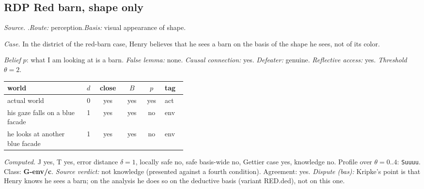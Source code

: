\subsection*{RDP \enspace Red barn, shape only}
\noindent\textit{Source.} \citet{Kripke2011}.\quad \textit{Route:} perception.\quad \textit{Basis:} visual appearance of shape.\par
\noindent\textit{Case.} In the district of the red-barn case, Henry believes that he sees a barn on the basis of the shape he sees, not of its color.\par
\noindent\textit{Belief} $p$: what I am looking at is a barn.
 \textit{False lemma:} none. \textit{Causal connection:} yes. \textit{Defeater:} genuine. \textit{Reflective access:} yes. \textit{Threshold} $\theta = 2$.\par
\begin{center}\begin{tabular}{@{}p{0.43\linewidth}rcccl@{}}
world & $d$ & close & $B$ & $p$ & tag \\ \midrule
actual world & 0 & yes & yes & yes & act \\
his gaze falls on a blue facade & 1 & yes & yes & no & env \\
he looks at another blue facade & 1 & yes & yes & no & env \\
\end{tabular}\end{center}
\noindent\textit{Computed.} J yes, T yes, error distance $\delta = 1$, locally safe no, safe basis-wide no, Gettier case yes, knowledge no. Profile over $\theta = 0..4$: \texttt{Suuuu}. Class: \textbf{G-env/c}.
 \textit{Source verdict:} not knowledge (presented against a fourth condition). Agreement: yes.
 \textit{Dispute (bas):} Kripke's point is that Henry knows he sees a barn; on the analysis he does so on the deductive basis (variant RED.ded), not on this one.
\par\medskip
{}
